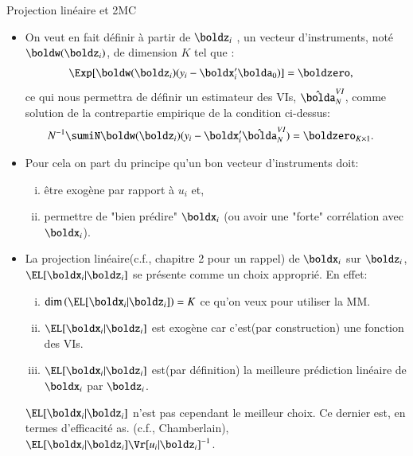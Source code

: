 
\begin{frame}[allowframebreaks]{Projection linéaire et 2MC}
\begin{itemize}
    \item On veut en fait définir à partir de $\boldz_i$ , un vecteur 
    d’instruments, noté $\boldw(\boldz_i)$, de 
    dimension $K$ tel que :
    \begin{align*}
    \Exp[\boldw(\boldz_i)(y_i-\boldx_i^\prime\bolda_0)]&=\boldzero,
    \end{align*}
    ce qui nous permettra de définir un estimateur des VIs, $\hat{\bolda}_N^{VI}$, comme solution 
    de la contrepartie empirique de la condition ci-dessus:
    \begin{align*}
        N^{-1}\sumiN\boldw(\boldz_i)(y_i-\boldx_i^\prime\hat{\bolda}_N^{VI})&=\boldzero_{K\times 1}.
    \end{align*}
    \item Pour cela on part du principe qu'un bon vecteur d'instruments doit:
    \begin{enumerate}[(i)]
        \item  être exogène par rapport à $u_i$ et,
         \item permettre de "bien prédire" $\boldx_i$ 
         (ou avoir une "forte" corrélation avec $\boldx_i$).
    \end{enumerate}
    \item La projection linéaire(c.f., chapitre 2 pour un rappel) de 
    $\boldx_i$ sur $\boldz_i$, $\EL[\boldx_i|\boldz_i]$ se présente 
    comme un choix approprié. En effet:
    \begin{enumerate}[(i)]
        \item $\dim\left(\EL[\boldx_i|\boldz_i]\right) = K$ 
      ce qu’on veux pour utiliser la MM.
        \item $\EL[\boldx_i|\boldz_i]$ est exogène car c'est(par construction) 
        une fonction des VIs.
        \item $\EL[\boldx_i|\boldz_i]$ est(par définition) la meilleure 
        prédiction linéaire de $\boldx_i$ par $\boldz_i$.
    \end{enumerate}
    \begin{remark_fr}
        $\EL[\boldx_i|\boldz_i]$ n'est pas cependant le meilleur choix. Ce dernier est, en termes d'efficacité as.
        (c.f., Chamberlain), $\EL[\boldx_i|\boldz_i] \Vr[u_i|\boldz_i]^{-1}$.
    \end{remark_fr}


\end{itemize}
\end{frame}
